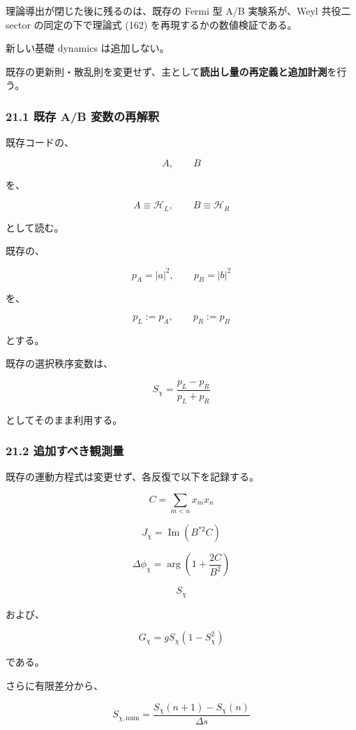 \documentclass[
  a4paper,
]{ltjsarticle}
\begin{document}
理論導出が閉じた後に残るのは、既存の Fermi 型 A/B 実験系が、Weyl 共役二
sector の同定の下で理論式 (162) を再現するかの数値検証である。

新しい基礎 dynamics は追加しない。

既存の更新則・散乱則を変更せず、主として\textbf{読出し量の再定義と追加計測}を行う。

\subsubsection{21.1 既存 A/B
変数の再解釈}\label{ux65e2ux5b58-ab-ux5909ux6570ux306eux518dux89e3ux91c8}

既存コードの、

\[
A,\qquad B
\]

を、

\[
\boxed{
A\equiv\mathcal H_L,
\qquad
B\equiv\mathcal H_R
}
\tag{173}
\]

として読む。

既存の、

\[
p_A=|a|^2,
\qquad
p_B=|b|^2
\]

を、

\[
p_L:=p_A,
\qquad
p_R:=p_B
\]

とする。

既存の選択秩序変数は、

\[
\boxed{
S_\chi
=
\frac{p_L-p_R}{p_L+p_R}
}
\tag{174}
\]

としてそのまま利用する。

\subsubsection{21.2
追加すべき観測量}\label{ux8ffdux52a0ux3059ux3079ux304dux89b3ux6e2cux91cf}

既存の運動方程式は変更せず、各反復で以下を記録する。

\[
C
=
\sum_{m<n}x_mx_n
\tag{175}
\]

\[
\boxed{
J_\chi
=
\operatorname{Im}
\left(
B^{*2}C
\right)
}
\tag{176}
\]

\[
\boxed{
\Delta\phi_\chi
=
\arg
\left(
1+\frac{2C}{B^2}
\right)
}
\tag{177}
\]

\[
S_\chi
\]

および、

\[
\boxed{
G_\chi
=
gS_\chi
\left(
1-S_\chi^2
\right)
}
\tag{178}
\]

である。

さらに有限差分から、

\[
\boxed{
\dot S_{\chi,\mathrm{num}}
=
\frac{
S_\chi(n+1)-S_\chi(n)
}{
\Delta s
}
}
\tag{179}
\]
\end{document}
